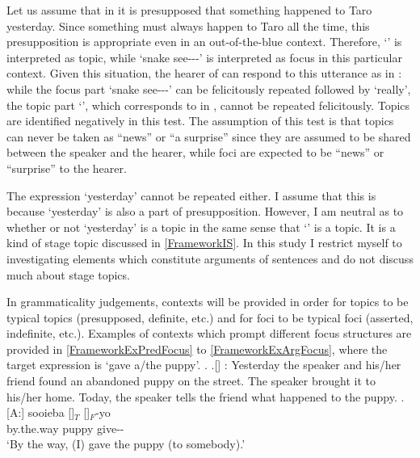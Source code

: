 Let us assume that in \Last[-Taro] it is presupposed that something happened to Taro yesterday.
Since something must always happen to Taro all the time,
this presupposition is appropriate even in an out-of-the-blue context.
Therefore,
 `' is interpreted as topic,
while  `snake see---' is interpreted as focus in this particular context.
Given this situation,
the hearer of \Last[-Taro] can respond to this utterance as in \Last[-Jiro]:
while the focus part  `snake see---' can be felicitously repeated followed by  `really',
the topic part  `',
which corresponds to  in \Last[-Jiro], cannot be repeated felicitously.
Topics are identified negatively in this test.
The assumption of this  test is that
topics can never be taken as ``news'' or ``a surprise'' since they are assumed to be shared between the speaker and the hearer,
while foci are expected to be ``news'' or ``surprise'' to the hearer.

The expression  `yesterday' cannot be repeated either.
I assume that this is because  `yesterday' is also a part of presupposition.
However, I am neutral as to whether or not  `yesterday' is a topic
in the same sense that  `' is a topic.
It is a kind of stage topic discussed in \ref{FrameworkIS}.
In this study I restrict myself to investigating elements which constitute arguments of sentences
and do not discuss much about stage topics.

In grammaticality judgements,
contexts will be provided
in order for topics to be typical topics (presupposed, definite, etc.)
and for foci to be typical foci (asserted, indefinite, etc.).
Examples of contexts which prompt different focus structures are provided in \ref{FrameworkExPredFocus} to \ref{FrameworkExArgFocus},
where the target expression is  `gave a/the puppy'.
%
	\ex. \label{FrameworkExPredFocus}
	\a.[] : Yesterday the speaker and his/her friend found an abandoned puppy on the street. The speaker brought it to his/her home. Today, the speaker tells the friend what happened to the puppy.
	\bg.[A:] sooieba []$_{T}$ []$_{F}$-yo \\
		by.the.way puppy give-- \\
		`By the way, (I) gave the puppy (to somebody).'

